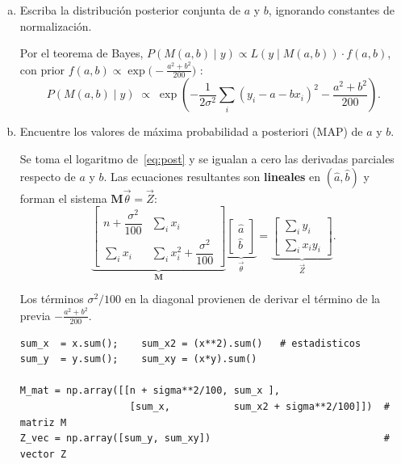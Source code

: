 \documentclass[a4paper]{article}
\begin{document}
\begin{enumerate}[a)]
    
    \item Escriba la distribución posterior conjunta de $a$ y $b$, ignorando constantes de normalización.
    
    Por el teorema de Bayes, $P(M(a,b)\mid y)\propto
L(y\mid M(a,b))\cdot f(a,b)$, con prior
$f(a,b)\propto\exp\!\bigl(-\tfrac{a^2+b^2}{200}\bigr)$ \cite{feigelson2012}:
\begin{equation}
  P\!\left(M(a,b)\mid y\right)
  \;\propto\;
  \exp\!\left(
    -\frac{1}{2\sigma^2}\sum_{i}(y_i-a-bx_i)^2
    -\frac{a^2+b^2}{200}
  \right).
  \label{eq:post}
\end{equation}

    \item Encuentre los valores de máxima probabilidad a posteriori (MAP) de $a$ y $b$.
    
    Se toma el logaritmo de~\eqref{eq:post} y se igualan a cero las
derivadas parciales respecto de $a$ y $b$.
Las ecuaciones resultantes son \textbf{lineales} en $(\hat{a},\hat{b})$
y forman el sistema $\mathbf{M}\vec\theta = \vec Z$:
\begin{equation}
  \underbrace{\begin{bmatrix}
    n + \dfrac{\sigma^2}{100} & \displaystyle\sum_i x_i \\[8pt]
    \displaystyle\sum_i x_i   & \displaystyle\sum_i x_i^2
                                +\dfrac{\sigma^2}{100}
  \end{bmatrix}}_{\mathbf{M}}
  \underbrace{\begin{bmatrix}\hat{a}\\\hat{b}\end{bmatrix}}_{\vec\theta}
  =
  \underbrace{\begin{bmatrix}
    \displaystyle\sum_i y_i \\[4pt]
    \displaystyle\sum_i x_iy_i
  \end{bmatrix}}_{\vec Z}.
  \label{eq:sistema}
\end{equation}

Los términos $\sigma^2/100$ en la diagonal provienen de derivar el
término de la previa $-\tfrac{a^2+b^2}{200}$.

\begin{lstlisting}
sum_x  = x.sum();    sum_x2 = (x**2).sum()   # estadisticos
sum_y  = y.sum();    sum_xy = (x*y).sum()

M_mat = np.array([[n + sigma**2/100, sum_x ],
                   [sum_x,           sum_x2 + sigma**2/100]])  # matriz M
Z_vec = np.array([sum_y, sum_xy])                              # vector Z


\end{lstlisting}
\end{enumerate}
\end{document}
